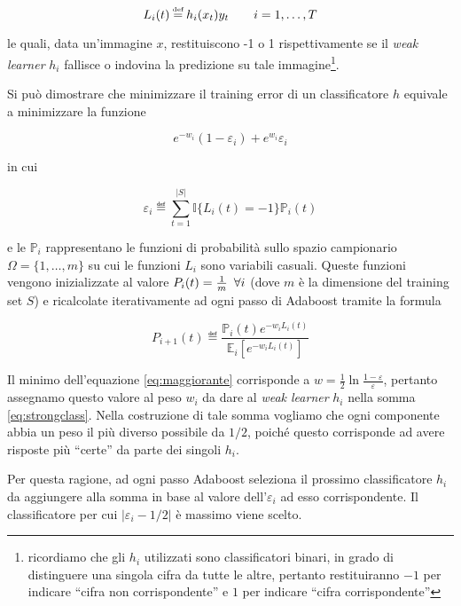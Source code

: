  \[ L_i(t) \eqdef h_i(x_t)y_t \hskip 2em  i = 1, \dotsc, T \]
 
le quali, data un'immagine $x$, restituiscono -1 o 1 rispettivamente se il {\it weak learner} $h_i$ fallisce o indovina la predizione su tale immagine\footnote{ricordiamo che gli $h_i$ utilizzati sono classificatori binari, in grado di distinguere una singola cifra da tutte le altre, pertanto restituiranno $-1$ per indicare ``cifra non corrispondente'' e $1$ per indicare ``cifra corrispondente''}.

Si pu\`o dimostrare che minimizzare il training error di un classificatore $h$ equivale a minimizzare la funzione

\begin{equation} \label{eq:maggiorante}
e^{-w_i}(1 - \varepsilon_i) + e^{w_i}\varepsilon_i 
\end{equation}

in cui

\[ \varepsilon_i \eqdef \sum\limits_{t=1}^{|S|}{\mathbb{I}\{L_i(t) = -1\}\mathbb{P}_i(t) } \]

e le $\mathbb{P}_i$ rappresentano le funzioni di probabilit\`a sullo spazio campionario \(\Omega = \{1, \dotsc, m\}\) su cui le funzioni $L_i$ sono variabili casuali. Queste funzioni vengono inizializzate al valore \(P_i(t) = \frac{1}{m} \hskip 0.5em \forall i \) (dove $m$ \`e la dimensione del training set $S$) e ricalcolate iterativamente ad ogni passo di Adaboost tramite la formula

\[ P_{i+1}(t) \eqdef \frac{\mathbb{P}_i(t)e^{-w_iL_i(t)}}{\mathbb{E}_i[e^{-w_iL_i(t)}]} \]

Il minimo dell'equazione \ref{eq:maggiorante} corrisponde a \(w = \frac{1}{2} \ln{\frac{1 - \varepsilon}{\varepsilon}}\), pertanto assegnamo questo valore al peso $w_i$ da dare al {\it weak learner} $h_i$ nella somma \ref{eq:strongclass}.
Nella costruzione di tale somma vogliamo che ogni componente abbia un peso il pi\`u  diverso possibile da $1/2$, poich\'e questo corrisponde ad avere risposte pi\`u ``certe'' da parte dei singoli $h_i$.

Per questa ragione, ad ogni passo Adaboost seleziona il prossimo classificatore $h_i$ da aggiungere alla somma in base al valore dell'$\varepsilon_i$ ad esso corrispondente. Il classificatore per cui \(|\varepsilon_i - 1/2|\) \`e massimo viene scelto.